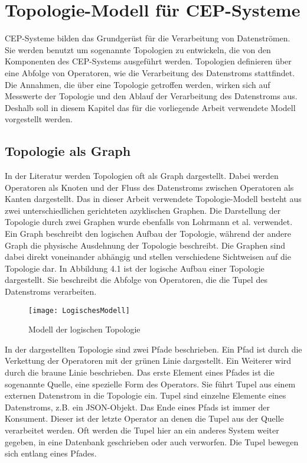 \chapter{Topologie-Modell für CEP-Systeme}

CEP-Systeme bilden das Grundgerüst für die Verarbeitung von Datenströmen.
Sie werden benutzt um sogenannte Topologien zu entwickeln, die von den Komponenten des CEP-Systems ausgeführt werden.
Topologien definieren über eine Abfolge von Operatoren, wie die Verarbeitung des Datenstroms stattfindet.
Die Annahmen, die über eine Topologie getroffen werden, wirken sich auf Messwerte der Topologie und den Ablauf der Verarbeitung des Datenstroms aus.
Deshalb soll in diesem Kapitel das für die vorliegende Arbeit verwendete Modell vorgestellt werden.

\section{Topologie als Graph}

In der Literatur werden Topologien oft als Graph dargestellt.
Dabei werden Operatoren als Knoten und der Fluss des Datenstroms zwischen Operatoren als Kanten dargestellt.
Das in dieser Arbeit verwendete Topologie-Modell besteht aus zwei unterschiedlichen gerichteten azyklischen Graphen.
Die Darstellung der Topologie durch zwei Graphen wurde ebenfalls von Lohrmann et al. \cite{lohrmann_elastic_2015} verwendet.
Ein Graph beschreibt den logischen Aufbau der Topologie, während der andere Graph die physische Ausdehnung der Topologie beschreibt.
Die Graphen sind dabei direkt voneinander abhängig und stellen verschiedene Sichtweisen auf die Topologie dar.
In Abbildung 4.1 ist der logische Aufbau einer Topologie dargestellt. 
Sie beschreibt die Abfolge von Operatoren, die die Tupel des Datenstroms verarbeiten.

\begin{figure}
\texttt{[image: LogischesModell]}
\caption{Modell der logischen Topologie}
\end{figure}

In der dargestellten Topologie sind zwei Pfade beschrieben.
Ein Pfad ist durch die Verkettung der Operatoren mit der grünen Linie dargestellt.
Ein Weiterer wird durch die braune Linie beschrieben.
Das erste Element eines Pfades ist die sogenannte Quelle, eine spezielle Form des Operators.
Sie führt Tupel aus einem externen Datenstrom in die Topologie ein.
Tupel sind einzelne Elemente eines Datenstroms, z.B. ein JSON-Objekt.
Das Ende eines Pfads ist immer der Konsument.
Dieser ist der letzte Operator an denen die Tupel aus der Quelle verarbeitet werden. 
Oft werden die Tupel hier an ein anderes System weiter gegeben, in eine Datenbank geschrieben oder auch verworfen.
Die Tupel bewegen sich entlang eines Pfades.

